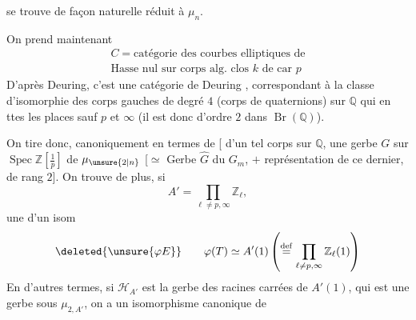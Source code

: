 
se trouve de façon naturelle réduit à $\mu_n$.

On prend maintenant
\[
\begin{gathered}
C=\text{catégorie des courbes elliptiques de}\\
\text{Hasse nul sur corps alg. clos $k$ de car $p$}
\end{gathered}
\]
D'après Deuring, c'est une catégorie de Deuring ,  correspondant à la classe d'isomorphie des corps gauches de degré $4$ (corps de quaternions) sur $\mathbb Q$  qui  en ttes les places sauf $p$ et $\infty$ (il est donc d'ordre $2$ dans $\operatorname{Br}(\mathbb Q)$).

On tire donc, canoniquement en  termes de  [  d'un tel corps sur $\mathbb Q$, une gerbe $G$ sur $\operatorname{Spec}\mathbb Z[\frac1p]$ de   $\mu_{\unsure{2|n}}$ [$\simeq$ Gerbe $\widehat G$ du  $G_m$, $+$ représentation  de ce dernier, de rang $2$]. On trouve de plus, si
\[
A'=\prod_{\ell\ne p,\infty}\mathbb Z_\ell,
\]
une 
 d'un isom
\[
\deleted{\unsure{\varphi E}}\qquad
\varphi(T)\simeq A'(1)\left(\overset{\mathrm{def}}=\prod_{\ell\ne p,\infty}\mathbb Z_\ell(1)\right)
\]
En d'autres termes, si $\mathcal H_{A'}$ est la gerbe des racines carrées de $A'(1)$, qui est une gerbe sous $\mu_{2,A'}$, on a un isomorphisme canonique de


